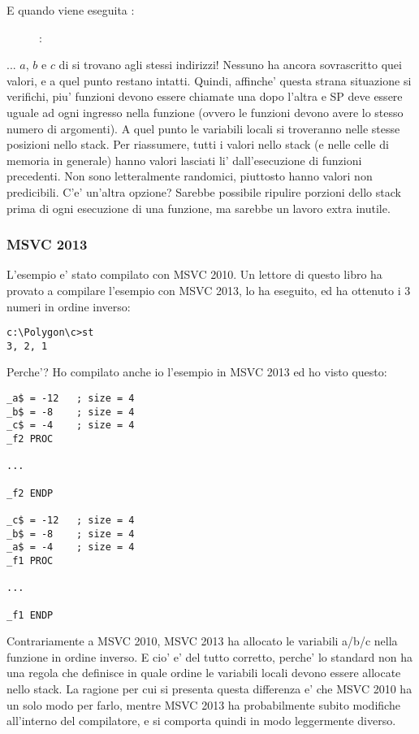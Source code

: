 \clearpage
E quando viene eseguita :

\begin{figure}[H]
\centering
{}
\caption{\olly: }
\label{fig:stack_noise_olly2}
\end{figure}

... $a$, $b$ e $c$ di  si trovano agli stessi indirizzi!
Nessuno ha ancora sovrascritto quei valori, e a quel punto restano intatti.
Quindi, affinche' questa strana situazione si verifichi, piu' funzioni devono essere chiamate una dopo l'altra e
\ac{SP} deve essere uguale ad ogni ingresso nella funzione (ovvero le funzioni devono avere lo stesso numero di argomenti).
A quel punto le variabili locali si troveranno nelle stesse posizioni nello stack.
Per riassumere, tutti i valori nello stack (e nelle celle di memoria in generale) hanno valori lasciati li' dall'esecuzione di funzioni precedenti.
Non sono letteralmente randomici, piuttosto hanno valori non predicibili.
C'e' un'altra opzione?
Sarebbe possibile ripulire porzioni dello stack prima di ogni esecuzione di una funzione, ma sarebbe un lavoro extra inutile.

\subsubsection{MSVC 2013}

L'esempio e' stato compilato con MSVC 2010.
Un lettore di questo libro ha provato a compilare l'esempio con MSVC 2013, lo ha eseguito, ed ha ottenuto i 3 numeri in ordine inverso:%

\begin{lstlisting}
c:\Polygon\c>st
3, 2, 1
\end{lstlisting}

Perche'?
Ho compilato anche io l'esempio in MSVC 2013 ed ho visto questo:


\begin{lstlisting}[caption=MSVC 2013,style=customasm]
_a$ = -12	; size = 4
_b$ = -8	; size = 4
_c$ = -4	; size = 4
_f2	PROC

...

_f2	ENDP

_c$ = -12	; size = 4
_b$ = -8	; size = 4
_a$ = -4	; size = 4
_f1	PROC

...

_f1	ENDP
\end{lstlisting}

Contrariamente a MSVC 2010, MSVC 2013 ha allocato le variabili a/b/c nella funzione  in ordine inverso.%
E cio' e' del tutto corretto, perche' lo standard \CCpp non ha una regola che definisce in quale ordine le variabili locali devono essere allocate nello stack.
La ragione per cui si presenta questa differenza e' che MSVC 2010 ha un solo modo per farlo, mentre MSVC 2013 ha probabilmente subito modifiche all'interno del compilatore, e si comporta quindi in modo leggermente diverso. 
